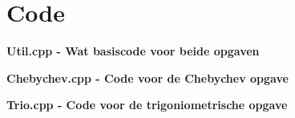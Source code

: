 \documentclass[10pt,a4paper]{article}
\begin{document}
\section{Code}
\textbf{Util.cpp - Wat basiscode voor beide opgaven}

\textbf{Chebychev.cpp - Code voor de Chebychev opgave}

\textbf{Trio.cpp - Code voor de trigoniometrische opgave}

\end{document}
